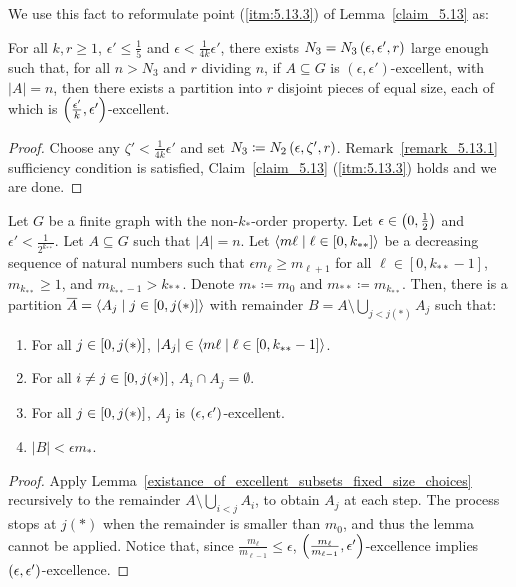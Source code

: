     We use this fact to reformulate point (\ref{itm:5.13.3}) of Lemma~\ref{claim_5.13} as:

    \lemma[Claim 5.13.2(3)]\label{existance_of_equitable_excellent_subpartition}
        For all $k, r \geq 1$, $\epsilon' \leq \frac{1}{5}$ and $\epsilon < \frac{1}{4k} \epsilon'$, there exists
        $N_3 = N_3\left( \epsilon, \epsilon', r \right)$ large enough such that, for all $n > N_3$ and $r$ dividing $n$,
        if $A \subseteq G$ is $\left( \epsilon, \epsilon' \right)$-excellent, with $|A| = n$, then there exists a
        partition into $r$ disjoint pieces of equal size, each of which is $\left( \frac{\epsilon'}{k}, \epsilon' \right)$-excellent.
        \begin{proof}
            Choose any $\zeta' < \frac{1}{4k} \epsilon'$ and set $N_3 \coloneq N_2\left( \epsilon, \zeta', r \right)$.
            Remark~\ref{remark_5.13.1} sufficiency condition is satisfied, Claim~\ref{claim_5.13} (\ref{itm:5.13.3}) holds
            and we are done.
        \end{proof}

    \lemma[Claim 5.14.1]\label{existance_of_excellent_partition}
        Let $G$ be a finite graph with the non-$k_{*}$-order property.
        Let $\epsilon \in \left( 0, \frac{1}{2} \right)$ and $\epsilon' < \frac{1}{2^{k_{**}}}$.
        Let $A \subseteq G$ such that $|A| = n$.
        Let $\left< m\ell \mid \ell \in [0, k_{**}] \right>$ be a decreasing sequence of natural numbers such that
        $\epsilon m_{\ell} \geq m_{\ell+1}$ for all $\ell \in [0, k_{**}-1]$, $m_{k_{**}} \geq 1$,
        and $m_{k_{**}-1} > k_{**}$. %
        Denote $m_* \coloneq m_0$ and $m_{**} \coloneq m_{k_{**}}$.
        Then, there is a partition $\overline{A} = \left< A_j \mid j \in \left[ 0, j(*) \right] \right>$ with remainder
        $B = A \setminus \bigcup_{j < j(*)} A_j$ such that:
        \begin{enumerate}[label=(\alph*), ref=\alph*]
            \item \label{itm:5.14.1.a} For all $j \in \left[ 0, j(*) \right]$, $|A_j| \in \left< m\ell \mid \ell \in [0, k_{**}-1] \right>$.
            \item \label{itm:5.14.1.b} For all $i \neq j \in \left[ 0, j(*) \right]$, $A_i \cap A_j = \emptyset$.
            \item \label{itm:5.14.1.c} For all $j \in \left[ 0, j(*) \right]$, $A_j$ is $\left( \epsilon, \epsilon' \right)$-excellent.
            \item \label{itm:5.14.1.d} $|B| < \epsilon m_*$.
        \end{enumerate}
        \begin{proof}
            Apply Lemma~\ref{existance_of_excellent_subsets_fixed_size_choices} recursively to the remainder
            $A \setminus \bigcup_{i < j} A_i$, to obtain $A_j$ at each step.
            The process stops at $j(*)$ when the remainder is smaller than $m_0$, and thus the lemma cannot be applied.
            Notice that, since $\frac{m_\ell}{m_{\ell-1}} \leq \epsilon$, $\left( \frac{m_\ell}{m_{\ell-1}}, \epsilon' \right)$-excellence
            implies $\left( \epsilon, \epsilon' \right)$-excellence.
        \end{proof}

